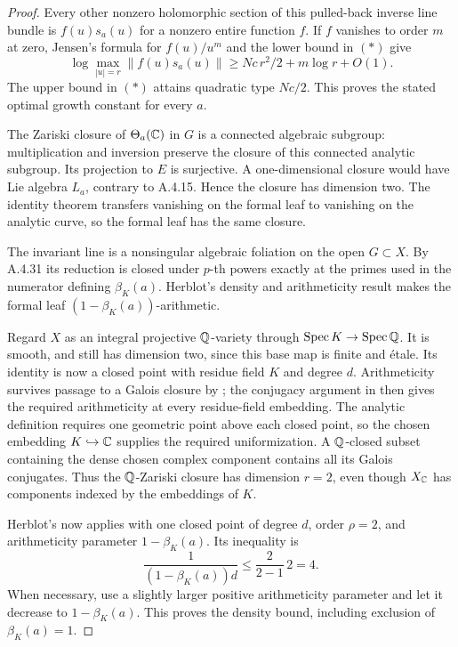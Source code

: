 \begin{proof}
Every other nonzero holomorphic section of this pulled-back
inverse line bundle is $f(u)s_a(u)$ for a nonzero entire
function $f$. If $f$ vanishes to order $m$ at zero, Jensen's
formula for $f(u)/u^m$ and the lower bound in $(*)$ give
\[
 \log\max_{|u|=r}\|f(u)s_a(u)\|
       \ge Nc\,r^2/2+m\log r+O(1).
\]
The upper bound in $(*)$ attains quadratic type $Nc/2$.
This proves the stated optimal growth constant for every $a$.

The Zariski closure of $\Theta_a(\mathbb C)$ in $G$ is a connected
algebraic subgroup: multiplication and inversion preserve
the closure of this connected analytic subgroup.
Its projection to $E$ is surjective. A one-dimensional closure
would have Lie algebra $L_a$, contrary to A.4.15. Hence the
closure has dimension two. The identity theorem transfers
vanishing on the formal leaf to vanishing on the analytic curve,
so the formal leaf has the same closure.

The invariant line is a nonsingular algebraic foliation on
the open $G\subset X$. By A.4.31 its reduction is closed under
$p$-th powers exactly at the primes used in the numerator
defining $\beta_K(a)$. Herblot's density and arithmeticity
result \cite[Definition 3.5 and Proposition 3.6, pp.20--21]{EllHerblot2012}
makes the formal leaf $(1-\beta_K(a))$-arithmetic.

Regard $X$ as an integral projective $\mathbb Q$-variety through
$\operatorname{Spec}K\to\operatorname{Spec}\mathbb Q$. It is smooth,
and still has dimension two, since this base map is finite
and \'etale. Its identity is now a closed point with residue
field $K$ and degree $d$.
Arithmeticity survives passage to a Galois closure by
\cite[Lemma 2.6]{EllHerblot2012}; the conjugacy argument
in \cite[Definition 4.6 and its remark, p.28]{EllHerblot2012}
then gives the required arithmeticity at every residue-field
embedding. The analytic definition requires one geometric
point above each closed point, so the chosen embedding
$K\hookrightarrow\mathbb C$ supplies the required uniformization.
A $\mathbb Q$-closed subset containing the dense chosen complex
component contains all its Galois conjugates. Thus the
$\mathbb Q$-Zariski closure has dimension $r=2$, even though
$X_\mathbb C$ has components indexed by the embeddings of $K$.

Herblot's \cite[Theorem 6.1, pp.31--32]{EllHerblot2012}
now applies with one closed point of degree $d$, order
$\rho=2$, and arithmeticity parameter $1-\beta_K(a)$.
Its inequality is
\[
 \frac1{(1-\beta_K(a))d}\le
       \frac{2}{2-1}\,2=4.
\]
When necessary, use a slightly larger positive arithmeticity
parameter and let it decrease to $1-\beta_K(a)$.
This proves the density bound, including exclusion of
$\beta_K(a)=1$.
\end{proof}

